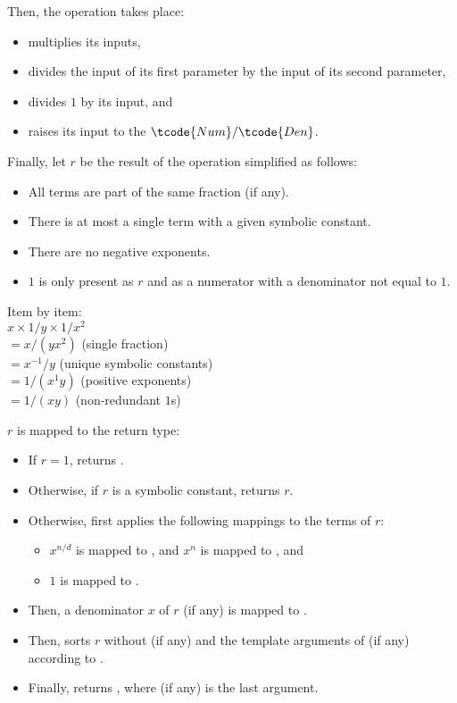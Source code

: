 \begin{itemdescr}
\pnum
Then, the operation takes place:
\begin{itemize}
\item
{} multiplies its inputs,
\item
{} divides the input of its first parameter by the input of its second parameter,
\item
{} divides $1$ by its input, and
\item
{} raises its input to the $\tcode{Num}/\tcode{Den}$.
\end{itemize}

\pnum
Finally, let $r$ be the result of the operation simplified as follows:
\begin{itemize}
\item
All terms are part of the same fraction (if any).
\item
There is at most a single term with a given symbolic constant.
\item
There are no negative exponents.
\item
$1$ is only present as $r$ and as a numerator with a denominator not equal to $1$.
\end{itemize}
\begin{example}
Item by item: \\
$x \times 1/y \times 1/x^2$ \\
$= x/(y x^2)$ (single fraction) \\
$= x^{-1}/y$ (unique symbolic constants) \\
$= 1/(x^1 y)$ (positive exponents) \\
$= 1/(xy)$ (non-redundant $1$s) \\
\end{example}

\pnum
\returns
$r$ is mapped to the return type:
\begin{itemize}
\item
If $r = 1$, returns .
\item
Otherwise, if $r$ is a symbolic constant, returns $r$.
\item
Otherwise, first applies the following mappings to the terms of $r$:
\begin{itemize}
\item
$x^{n/d}$ is mapped to , and
$x^{n}$ is mapped to , and
\item
$1$ is mapped to .
\end{itemize}
\item
Then, a denominator $x$ of $r$ (if any) is mapped to .
\item
Then, sorts $r$ without  (if any) and
the template arguments of  (if any)
according to .
\item
Finally, returns , where  (if any) is the last argument.
\end{itemize}


\end{itemdescr}
